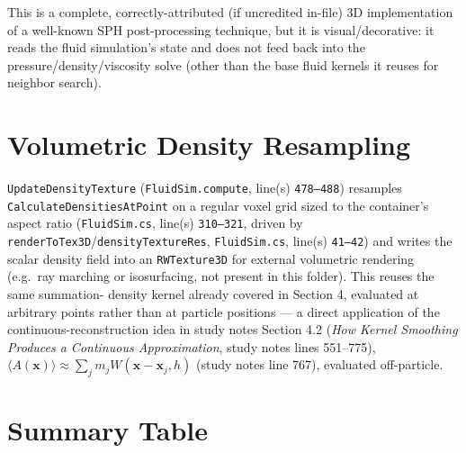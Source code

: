 \documentclass[11pt]{article}
\newcommand{\loc}[2]{\texttt{#1}, line(s) \texttt{#2}}
\begin{document}
This is a complete, correctly-attributed (if uncredited in-file) 3D
implementation of a well-known SPH post-processing technique, but it is
visual/decorative: it reads the fluid simulation's state and does not feed
back into the pressure/density/viscosity solve (other than the base fluid
kernels it reuses for neighbor search).

\section{Volumetric Density Resampling}

\texttt{UpdateDensityTexture} (\loc{FluidSim.compute}{478--488}) resamples
\texttt{CalculateDensitiesAtPoint} on a regular voxel grid sized to the
container's aspect ratio (\loc{FluidSim.cs}{310--321}, driven by
\texttt{renderToTex3D}/\texttt{densityTextureRes},
\loc{FluidSim.cs}{41--42}) and writes the scalar density field into an
\texttt{RWTexture3D} for external volumetric rendering (e.g.\ ray marching or
isosurfacing, not present in this folder). This reuses the same summation-
density kernel already covered in Section 4, evaluated at arbitrary points
rather than at particle positions --- a direct application of the
continuous-reconstruction idea in study notes Section 4.2
(\emph{How Kernel Smoothing Produces a Continuous Approximation}, study
notes lines 551--775), $\langle A(\mathbf{x})\rangle \approx \sum_j m_j
W(\mathbf{x}-\mathbf{x}_j,h)$ (study notes line 767), evaluated off-particle.

\section{Summary Table}
\end{document}
